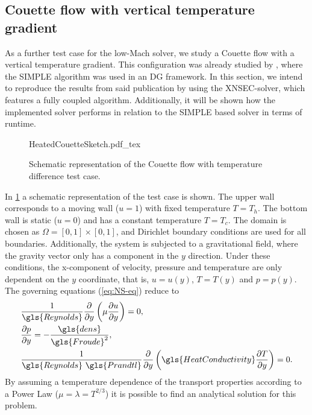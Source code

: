 \subsection{Couette flow with vertical temperature gradient} \label{ssec:CouetteFlowTempDiff}
As a further test case for the low-Mach solver, we study a Couette flow with a vertical temperature gradient. This configuration was already studied by \cite{kleinHighorderDiscontinuousGalerkin2016}, where the SIMPLE algorithm was used in an DG framework. In this section, we intend to reproduce the results from said publication by using the XNSEC-solver, which features a fully coupled algorithm. Additionally, it will be shown how the implemented solver performs in relation to the SIMPLE based solver in terms of runtime.%
\begin{figure}[tb]
	\begin{center}
		\def\svgwidth{0.5\textwidth}
		{HeatedCouetteSketch.pdf_tex}
		\vspace{0.2cm}
		\caption{Schematic representation of the Couette flow with temperature difference test case.}\label{fig:CouetteTempDiff_scheme}
	\end{center}
\end{figure}%
In \cref{fig:CouetteTempDiff_scheme} a schematic representation of the test case is shown. The upper wall corresponds to a moving wall ($u = 1$) with fixed temperature $T=T_h$. The bottom wall is static ($u = 0$) and has a constant temperature $T = T_c$.
The domain is chosen as $\Omega = [0,1]\times[0,1]$, and Dirichlet boundary conditions are used for all boundaries. Additionally, the system is subjected to a gravitational field, where the gravity vector only has a component in the $y$ direction. Under these conditions, the x-component of velocity, pressure and temperature are only dependent on the $y$ coordinate, that is, $u = u(y)$, $T = T(y)$ and $p = p(y)$. The governing equations (\cref{eq:NS-eq}) reduce to%
\begin{subequations}
    \begin{align}
    	 & \frac{1}{\gls{Reynolds}} \pfrac{ }{y}\left(\mu\pfrac{u}{y}\right) = 0,\\
    	 & \pfrac{p}{y} = -\frac{\gls{dens}}{\gls{Froude}^2},\\
    	 & \frac{1}{\gls{Reynolds}~\gls{Prandtl}} \pfrac{ }{y}\left(\gls{HeatConductivity}\pfrac{T}{y}\right) = 0.
    \end{align}\label{eq:AllCouetteEquations}
\end{subequations}
By assuming a temperature dependence of the transport properties according to a Power Law ($\mu = \lambda = T^{2/3}$) it is possible to find an analytical solution for this problem.
